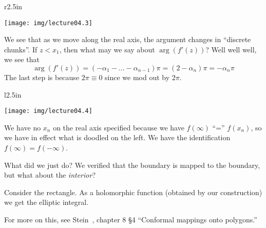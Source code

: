\begin{wrapfigure}{r}{2.5in}
\vspace{-30pt}
\begin{center}
\texttt{[image: img/lecture04.3]}
\end{center}
\vspace{-20pt}
\end{wrapfigure}
We see that as we move along the real axis, the argument changes
in ``discrete chunks''. If $z<x_{1}$, then
what may we say about $\arg(f'(z))$? Well well well, we see that
\begin{equation}
\arg(f'(z))=(-\alpha_{1}-\dots-\alpha_{n-1})\pi=(2-\alpha_{n})\pi=-\alpha_{n}\pi
\end{equation}
The last step is because $2\pi\equiv0$ since we mod out by $2\pi$.

\begin{wrapfigure}{l}{2.5in}
\vspace{-20pt}
\begin{center}
\texttt{[image: img/lecture04.4]}
\end{center}
\vspace{-20pt}
\end{wrapfigure}
\noindent{}We have no $x_{n}$ on the real axis specified because
we have $f(\infty)$ ``='' $f(x_{n})$, so we have in effect what
is doodled on the left. We have the identification
$f(\infty)=f(-\infty)$. 

What did we just do? We verified that the boundary is mapped to
the boundary, but what about the \emph{interior}?

Consider the rectangle. As a holomorphic function (obtained by
our construction) we get the elliptic integral.

\begin{rmk}
For more on this, see Stein~\cite{stein}, chapter 8 \S4
``Conformal mappings onto polygons.''
\end{rmk}
